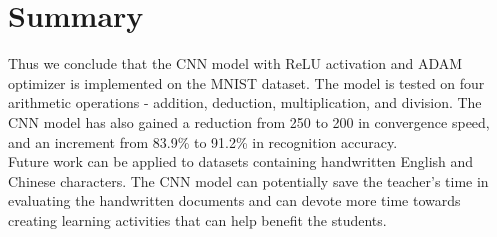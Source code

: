 \section{Summary}
\noindent
Thus we conclude that the CNN model with ReLU activation and ADAM optimizer is implemented on the MNIST dataset. The model is tested on four arithmetic operations - addition, deduction, multiplication, and division. The CNN model has also gained a reduction from 250 to 200 in convergence speed, and an increment from 83.9\% to 91.2\% in recognition accuracy.\\
Future work can be applied to datasets containing handwritten English and Chinese characters. The CNN model can potentially save the teacher's time in evaluating the handwritten documents and can devote more time towards creating learning activities that can help benefit the students.